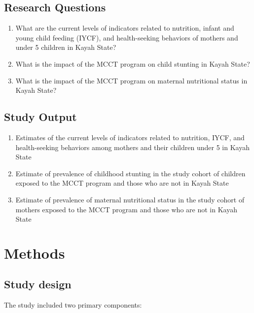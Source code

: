 \documentclass[12pt,a4paper]{article}
\begin{document}
\hypertarget{research-questions}{%
\subsection{Research Questions}\label{research-questions}}

\begin{enumerate}
\def\labelenumi{\arabic{enumi}.}
\item
  What are the current levels of indicators related to nutrition, infant and young child feeding (IYCF), and health-seeking behaviors of mothers and under 5 children in Kayah State?
\item
  What is the impact of the MCCT program on child stunting in Kayah State?
\item
  What is the impact of the MCCT program on maternal nutritional status in Kayah State?
\end{enumerate}

\hypertarget{study-outputs}{%
\subsection{Study Output}\label{study-outputs}}

\begin{enumerate}
\def\labelenumi{\arabic{enumi}.}
\item
  Estimates of the current levels of indicators related to nutrition, IYCF, and health-seeking behaviors among mothers and their children under 5 in Kayah State
\item
  Estimate of prevalence of childhood stunting in the study cohort of children exposed to the MCCT program and those who are not in Kayah State
\item
  Estimate of prevalence of maternal nutritional status in the study cohort of mothers exposed to the MCCT program and those who are not in Kayah State
\end{enumerate}

\hypertarget{methods}{%
\section{Methods}\label{methods}}

\hypertarget{design}{%
\subsection{Study design}\label{design}}

The study included two primary components:
\end{document}

